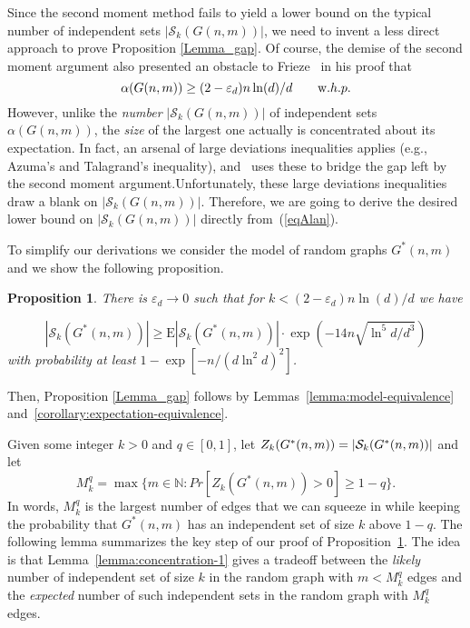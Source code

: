 \documentclass[a4paper,10pt]{article}
\newtheorem{proposition}{Proposition}\renewcommand{\theproposition}{\arabic{proposition}}
\newcommand\cS{\mathcal{S}}
\newcommand\eps{\varepsilon}
\newcommand\Erw{\mathrm{E}}
\newcommand\ra{\rightarrow}
\newcommand\bc[1]{\left({#1}\right)}
\newcommand{\whp}{w.h.p.}
\newcommand\Lem{Lemma}
\newcommand\Prop{Proposition}
\begin{document}
Since the second moment method fails to yield a lower bound on
the typical number  of independent sets $|\cS_k(G(n,m))|$, we
need to invent a less direct approach to prove Proposition \ref{Lemma_gap}.
Of course, the demise of the second moment argument also presented
an obstacle to Frieze~\cite{frieze-is} in his proof that
		\begin{equation}\label{eqAlan}
		\alpha(G(n,m))\geq(2-\eps_d)n\ln(d)/d\qquad\mbox\whp
		\end{equation}
However, unlike the \emph{number} $|\cS_k(G(n,m))|$ of independent
sets $\alpha(G(n,m))$, the \emph{size}  of the largest one actually
is concentrated about its expectation. In fact, an arsenal of large
deviations inequalities applies (e.g., Azuma's and Talagrand's
inequality), and~\cite{frieze-is} uses these to bridge the gap
left by the second moment argument.Unfortunately, these large
deviations inequalities draw a blank on $|\cS_k(G(n,m))|$. Therefore,
we are going to derive the desired lower bound on $|\cS_k(G(n,m))|$
directly from~(\ref{eqAlan}).


To simplify our derivations we consider the model of random graphs
$G^*(n,m)$ and we show the following proposition.
\begin{proposition}\label{proposition:star-conctration}
There is $\eps_d\ra0$ such that for $k<(2-\eps_d)n\ln(d)/d$ we 
have

\begin{equation}\label{eq:prop:star-conct}
|\cS_k(G^*(n,m))|\geq\Erw|\cS_k(G^*(n,m))|\cdot\exp\bc{-14n 
\sqrt{{\ln^{5}d}/{d^3}}}
\end{equation}
with probability at least $1-\exp\left[-n/(d\ln^2d)^2\right]$.
\end{proposition}
Then, Proposition \ref{Lemma_gap} follows by Lemmas~\ref{lemma:model-equivalence}
and~\ref{corollary:expectation-equivalence}.


Given some integer $k>0$ and $q\in [0,1]$, let 	$Z_k(G^*(n,m))=|{\cal S}_k(G^*(n,m))|$
and let 		$$M^q_k=\max\{m\in \mathbb{N}:Pr[Z_k(G^*(n,m))>0]\geq 1-q\}.$$
In words, $M^q_k$ is the largest number of edges that we can squeeze
in while keeping the probability that $G^*(n,m)$  has an independent
set of size $k$ above $1-q$. The following lemma summarizes the key
step of our proof of \Prop~\ref{proposition:star-conctration}. The
idea is that \Lem~\ref{lemma:concentration-1} gives a tradeoff
between the \emph{likely} number of independent set of size $k$
in the random graph with $m<M^q_k$ edges and the \emph{expected}
number of such independent sets in the random graph with $M^q_k$
edges.
\end{document}
